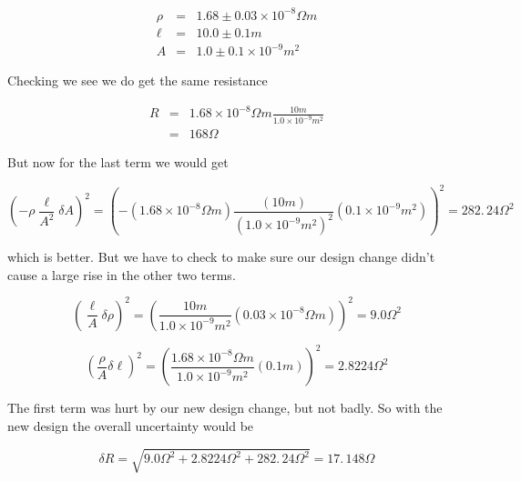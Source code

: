 \begin{eqnarray*}
	\rho &=&1.68\pm 0.03\times 10^{-8}\unit{\Omega}\unit{m} \\
	\ell &=&10.0\pm 0.1\unit{m} \\
	A &=&1.0\pm 0.1\times 10^{-9}\unit{m}^{2}
\end{eqnarray*}

Checking we see we do get the same resistance 

\begin{eqnarray*}
	R &=&1.68\times 10^{-8}\unit{\Omega	}\unit{m}\frac{10\unit{m}}{1.0\times 10^{-9}\unit{m}^{2}} \\
	&=&168\unit{\Omega}
\end{eqnarray*}

\noindent But now for the last term we would get 

\begin{equation*}
	\left( -\rho \frac{\ell }{A^{2}}\delta A\right) ^{2}=\left( -\left(
	1.68\times 10^{-8}\unit{\Omega}\unit{m}\right) \frac{\left( 10\unit{m}\right) }{\left( 1.0\times 10^{-9}\unit{m}^{2}\right) ^{2}}\left( 0.1\times 10^{-9}\unit{m}^{2}\right) \right)^{2}=282.\,\allowbreak 24\unit{\Omega}^{2}
\end{equation*}

\noindent which is better. But we have to check to make sure our design change didn't
cause a large rise in the other two terms. 

\begin{equation*}
	\left( \frac{\ell }{A}\delta \rho \right) ^{2}=\left( \frac{10\unit{m}}{		1.0\times 10^{-9}\unit{m}^{2}}\left( 0.03\times 10^{-8}\unit{\Omega}\unit{m}\right) \right) ^{2}=9.0\unit{\Omega}^{2}
\end{equation*}

\begin{equation*}
	\left( \frac{\rho }{A}\delta \ell \right) ^{2}=\left( \frac{1.68\times
		10^{-8}\unit{\Omega}\unit{m}}{1.0\times 10^{-9}\unit{m}^{2}}\left( 0.1\unit{m}\right) \right)^{2}=2.8224\unit{\Omega}^{2}
\end{equation*}

The first term was hurt by our new design change, but not badly. So with the new design the overall uncertainty would be 

\begin{equation*}
	\delta R=\sqrt{9.0\unit{\Omega}^{2}+2.8224\unit{\Omega}^{2}+282.\,\allowbreak 24\unit{\Omega		}^{2}}=17.\,\allowbreak 148\unit{\Omega}
\end{equation*}

